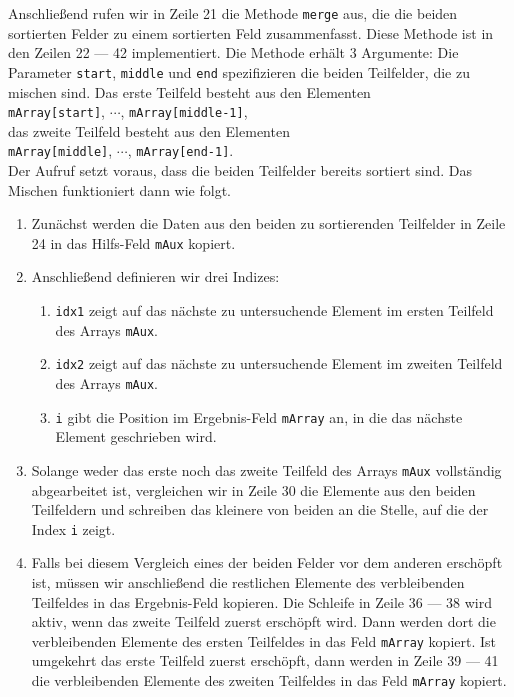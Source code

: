 Anschlie{\ss}end rufen wir in Zeile 21 die Methode \texttt{merge} aus, die die beiden
sortierten Felder zu einem sortierten Feld zusammenfasst.  Diese Methode ist in den Zeilen
22 --- 42 implementiert.  Die Methode erh\"alt 3 Argumente: Die Parameter \texttt{start},
\texttt{middle} und \texttt{end} spezifizieren die beiden Teilfelder, die zu mischen sind.
Das erste Teilfeld besteht aus den Elementen \\[0.1cm]
\hspace*{1.3cm} \texttt{mArray[start]}, $\cdots$, \texttt{mArray[middle-1]}, \\[0.1cm]
das zweite Teilfeld besteht aus den Elementen \\[0.1cm]
\hspace*{1.3cm} \texttt{mArray[middle]}, $\cdots$, \texttt{mArray[end-1]}. \\[0.1cm]
Der Aufruf setzt voraus, dass die beiden Teilfelder bereits sortiert sind.
Das Mischen funktioniert dann wie folgt.
\begin{enumerate}
\item Zun\"achst werden die Daten aus den beiden zu sortierenden Teilfelder
      in Zeile 24 in das Hilfs-Feld \texttt{mAux} kopiert.
\item Anschlie{\ss}end definieren wir drei Indizes:
      \begin{enumerate}
      \item \texttt{idx1} zeigt auf das n\"achste zu untersuchende Element im ersten
            Teilfeld des Arrays \texttt{mAux}.
      \item \texttt{idx2} zeigt auf das n\"achste zu untersuchende Element im zweiten
            Teilfeld des Arrays \texttt{mAux}.
      \item \texttt{i} gibt die Position im Ergebnis-Feld \texttt{mArray} an, in die das
            n\"achste Element geschrieben wird.
      \end{enumerate}
\item Solange weder das erste noch das zweite Teilfeld des Arrays \texttt{mAux}
      vollst\"andig abgearbeitet ist, vergleichen wir in Zeile 30 die Elemente aus den beiden Teilfeldern
      und schreiben das kleinere von beiden an die Stelle, auf die der Index \texttt{i} zeigt.
\item Falls bei diesem Vergleich eines der beiden Felder vor dem anderen ersch\"opft ist,
      m\"ussen wir anschlie{\ss}end die restlichen Elemente des verbleibenden Teilfeldes
      in das Ergebnis-Feld kopieren.  Die Schleife in Zeile 36 --- 38 wird aktiv, wenn das
      zweite Teilfeld zuerst ersch\"opft wird.  Dann werden dort die verbleibenden Elemente
      des ersten Teilfeldes in das Feld \texttt{mArray} kopiert.  Ist umgekehrt das erste
      Teilfeld zuerst ersch\"opft, dann werden in Zeile 39 --- 41 die verbleibenden Elemente
      des zweiten Teilfeldes in das Feld \texttt{mArray} kopiert. 
\end{enumerate}
\pagebreak

